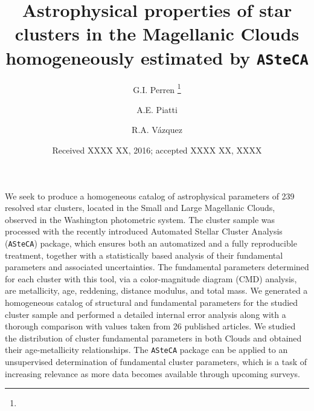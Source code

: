 \documentclass[draft]{aa}
\begin{document}
\title{Astrophysical properties of star clusters in the Magellanic Clouds
homogeneously estimated by \texttt{ASteCA}}
\subtitle{}

   \author{G.I. Perren
          \thanks{}
          \and
          A.E. Piatti
          \and
          R.A. V\'azquez
          }


   \date{Received XXXX XX, 2016; accepted XXXX XX, XXXX}

 
\abstract
{}
{We seek to produce a homogeneous catalog of astrophysical parameters of 239
resolved star clusters, located in the Small and Large Magellanic Clouds,
observed in the Washington photometric system.}
{The cluster sample was processed with the recently introduced Automated
Stellar Cluster Analysis (\texttt{ASteCA}) package, which ensures both an
automatized and a fully reproducible treatment, together with a statistically
based analysis of their fundamental parameters and associated uncertainties.
%
The fundamental parameters determined for each cluster with this tool, via a
color-magnitude diagram (CMD) analysis, are metallicity, age, reddening,
distance modulus, and total mass.}
{We generated a homogeneous catalog of structural and fundamental parameters
for the studied cluster sample and performed a detailed internal error analysis
along with a thorough comparison with values taken from 26 published
articles.
We studied the distribution of cluster fundamental parameters in both Clouds
and obtained their age-metallicity relationships.}
{The \texttt{ASteCA} package can be applied to an unsupervised determination of
fundamental cluster parameters, which is a task of increasing relevance as more
data becomes available through upcoming surveys.}

\end{document}
